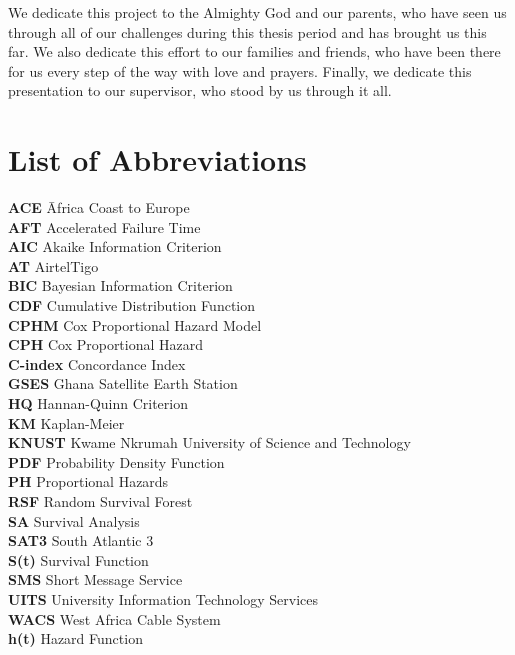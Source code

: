 \documentclass[doublespacing,12pt]{report}
\begin{document}
We dedicate this project to the Almighty God and our parents, who have seen us through all of our challenges during this thesis period and has brought us this far. We also dedicate this effort to our families and friends, who have been there for us every step of the way with love and prayers. Finally, we dedicate this presentation to our supervisor, who stood by us through it all.  



\newpage
\renewcommand{\contentsname}{Table of Content} %
\tableofcontents %

\newpage
\listoftables

\newpage
\listoffigures

\newpage
\chapter*{List of Abbreviations}

\begin{tabbing}
    \textbf{ACE} \hspace{2cm} \= Africa Coast to Europe \\
    \textbf{AFT} \> Accelerated Failure Time \\
    \textbf{AIC} \> Akaike Information Criterion \\
    \textbf{AT} \> AirtelTigo \\
    \textbf{BIC} \> Bayesian Information Criterion \\
    \textbf{CDF} \> Cumulative Distribution Function \\
    \textbf{CPHM} \> Cox Proportional Hazard Model \\
    \textbf{CPH} \> Cox Proportional Hazard \\
    \textbf{C-index} \> Concordance Index \\
    \textbf{GSES} \> Ghana Satellite Earth Station \\
    \textbf{HQ} \> Hannan-Quinn Criterion \\
    \textbf{KM} \> Kaplan-Meier \\
    \textbf{KNUST} \> Kwame Nkrumah University of Science and Technology \\
    \textbf{PDF} \> Probability Density Function \\
    \textbf{PH} \> Proportional Hazards \\
    \textbf{RSF} \> Random Survival Forest \\
    \textbf{SA} \> Survival Analysis \\
    \textbf{SAT3} \> South Atlantic 3 \\
    \textbf{S(t)} \> Survival Function \\
    \textbf{SMS} \> Short Message Service \\
    \textbf{UITS} \> University Information Technology Services \\
    \textbf{WACS} \> West Africa Cable System \\
    \textbf{h(t)} \> Hazard Function \\
\end{tabbing}
\end{document}
